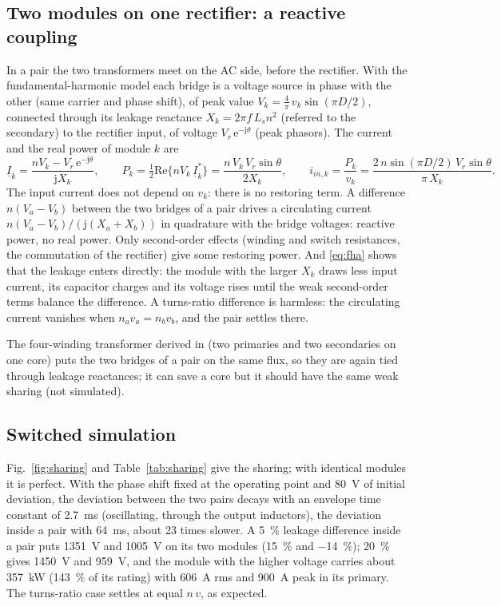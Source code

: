 \documentclass[10pt,a4paper]{scrartcl}
\newcommand{\jj}{\mathrm{j}}
\newcommand{\ee}{\mathrm{e}}
\newcommand{\Ls}{L_s}
\begin{document}
\begin{onehalfspace}
\subsection{Two modules on one rectifier: a reactive coupling}

In a pair the two transformers meet on the AC side, before the rectifier. With the fundamental-harmonic model each bridge is a voltage source in phase with the other (same carrier and phase shift), of peak value $V_k = \tfrac{4}{\pi}\,v_k \sin(\pi D/2)$, connected through its leakage reactance $X_k = 2\pi f\,\Ls n^2$ (referred to the secondary) to the rectifier input, of voltage $V_r\,\ee^{-\jj\theta}$ (peak phasors). The current and the real power of module $k$ are
\begin{equation}
\underline{I}_k = \frac{n V_k - V_r\,\ee^{-\jj\theta}}{\jj X_k}, \qquad P_k = \tfrac{1}{2}\mathrm{Re}\{n V_k\,\underline{I}_k^*\} = \frac{n\,V_k\,V_r\sin\theta}{2X_k}, \qquad i_{in,k} = \frac{P_k}{v_k} = \frac{2\,n\sin(\pi D/2)\,V_r\sin\theta}{\pi\,X_k}.
\label{eq:fha}
\end{equation}
The input current does not depend on $v_k$: there is no restoring term. A difference $n(V_a - V_b)$ between the two bridges of a pair drives a circulating current $n(V_a - V_b)/(\jj(X_a + X_b))$ in quadrature with the bridge voltages: reactive power, no real power. Only second-order effects (winding and switch resistances, the commutation of the rectifier) give some restoring power. And \eqref{eq:fha} shows that the leakage enters directly: the module with the larger $X_k$ draws less input current, its capacitor charges and its voltage rises until the weak second-order terms balance the difference. A turns-ratio difference is harmless: the circulating current vanishes when $n_a v_a = n_b v_b$, and the pair settles there.

The four-winding transformer derived in  (two primaries and two secondaries on one core) puts the two bridges of a pair on the same flux, so they are again tied through leakage reactances; it can save a core but it should have the same weak sharing (not simulated).

\subsection{Switched simulation}

Fig.~\ref{fig:sharing} and Table~\ref{tab:sharing} give the sharing; with identical modules it is perfect. With the phase shift fixed at the operating point and \SI{80}{V} of initial deviation, the deviation between the two pairs decays with an envelope time constant of \SI{2.7}{ms} (oscillating, through the output inductors), the deviation inside a pair with \SI{64}{ms}, about 23 times slower. A \SI{5}{\percent} leakage difference inside a pair puts \SI{1351}{V} and \SI{1005}{V} on its two modules (\SI{+15}{\percent} and \SI{-14}{\percent}); \SI{20}{\percent} gives \SI{1450}{V} and \SI{959}{V}, and the module with the higher voltage carries about \SI{357}{kW} (\SI{143}{\percent} of its rating) with \SI{606}{A} rms and \SI{900}{A} peak in its primary. The turns-ratio case settles at equal $n\,v$, as expected.


\end{onehalfspace}
\end{document}
